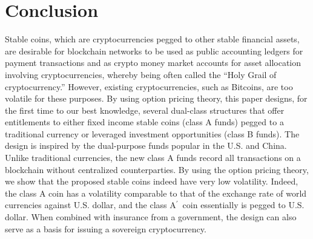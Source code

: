 \documentclass[draft, noinfoline]{ectaart}
\numberwithin{equation}{section}
\theoremstyle{plain}
\newcommand{\Ap}{A\ensuremath{^\prime}~}
\begin{document}
\section{Conclusion}
Stable coins, which are cryptocurrencies pegged to other stable financial assets, are desirable for blockchain networks to be used as public accounting ledgers for payment transactions  and as crypto money market accounts for asset allocation involving cryptocurrencies, whereby being often called the ``Holy Grail of cryptocurrency.'' However, existing cryptocurrencies, such as Bitcoins, are too volatile for these purposes. By using option pricing theory, this paper designs, for the first time to our best knowledge, several dual-class structures that offer entitlements to either fixed income stable coins (class A funds) pegged to a traditional currency or leveraged investment opportunities (class B funds). The design is inspired by the dual-purpose funds popular in the U.S. and China. Unlike traditional currencies, the new class A funds record all transactions on a blockchain without centralized counterparties. By using the option pricing theory, we show that the proposed stable coins indeed have very low volatility. Indeed, the class A coin has a volatility comparable to that of the exchange rate of world currencies against U.S. dollar, and the class \Ap coin essentially is pegged to U.S. dollar. When combined with insurance from a government, the design can also serve as a basis for issuing a sovereign cryptocurrency.


%




\newpage





%

\setcounter{page}{1}
\renewcommand{\thepage}{A--\arabic{page}}
\end{document}
